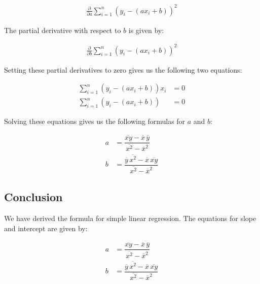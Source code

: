 \begin{align}
	\frac{\partial}{\partial a} \sum_{i=1}^{n} (y_i - (ax_i + b))^2
\end{align}

The partial derivative with respect to $b$ is given by:

\begin{align}
	\frac{\partial}{\partial b} \sum_{i=1}^{n} (y_i - (ax_i + b))^2
\end{align}

Setting these partial derivatives to zero gives us the following two equations:

\begin{align}
	\sum_{i=1}^{n} (y_i - (ax_i + b))x_i &= 0 \\
	\sum_{i=1}^{n} (y_i - (ax_i + b)) &= 0
\end{align}

Solving these equations gives us the following formulas for $a$ and $b$:

\begin{align}
	a &= \dfrac{\overline{xy} - \overline{x} \, \overline{y}}{\overline{x^2} - \overline{x}^2} \\
	b &= \dfrac{\overline{y} \, \overline{x^2} - \overline{x} \, \overline{xy}}{\overline{x^2} - \overline{x}^2}
\end{align}

\subsection{Conclusion}

We have derived the formula for simple linear regression. The equations for slope and intercept are given by:

\begin{align}
	a &= \dfrac{\overline{xy} - \overline{x} \, \overline{y}}{\overline{x^2} - \overline{x}^2} \\
	b &= \dfrac{\overline{y} \, \overline{x^2} - \overline{x} \, \overline{xy}}{\overline{x^2} - \overline{x}^2}
\end{align}

\clearpage


